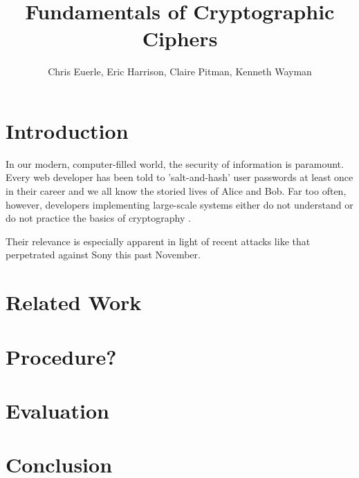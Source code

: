 \documentclass[11pt]{article}
\title{\textbf{Fundamentals of Cryptographic Ciphers}}
\author{Chris Euerle, Eric Harrison, Claire Pitman, Kenneth Wayman}
\date{}
\begin{document}
\maketitle

\section{Introduction}

\hspace{4mm} In our modern, computer-filled world, the security of information is paramount. Every web developer has been told to 'salt-and-hash' user passwords at least once in their career and we all know the storied lives of Alice and Bob.  Far too often, however, developers implementing large-scale systems either do not understand or do not practice the basics of cryptography \cite{ Software-Security}.  

\vspace{3mm}

Their relevance is especially apparent in light of recent attacks like that perpetrated against Sony this past November.  

\section{Related Work}

\section{Procedure?}

\section{Evaluation}

\section{Conclusion}


{}

\end{document}
